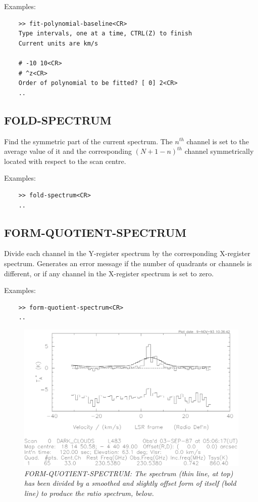 \documentclass[11pt,twoside]{report}
\begin{document}
Examples:
\begin{verbatim}
    >> fit-polynomial-baseline<CR>
    Type intervals, one at a time, CTRL(Z) to finish
    Current units are km/s  

    # -10 10<CR>
    # ^z<CR>
    Order of polynomial to be fitted? [ 0] 2<CR>
    ..
\end{verbatim}

\subsection{FOLD-SPECTRUM} 

Find the symmetric part of the current spectrum. The $n^{th}$ channel is set to 
the average value of it and the corresponding $(N+1-n)^{th}$ channel
symmetrically located with respect to the scan centre.

Examples:
\begin{verbatim}
    >> fold-spectrum<CR>
    ..
\end{verbatim}

\subsection{FORM-QUOTIENT-SPECTRUM} 

Divide each channel in the Y-register spectrum by the corresponding X-register
spectrum. Generates an error message if the number of quadrants or channels
is different, or if any channel in the X-register spectrum is set to zero.

Examples:
\begin{verbatim}
    >> form-quotient-spectrum<CR>
    ..
\end{verbatim}

\begin{figure}[htbp]
\begin{center}
\includegraphics[scale=0.65]{quotient.ps}
\protect\parbox{5.5in}
{\caption[QUOTIENT]
{\sl
FORM-QUOTIENT-SPECTRUM: The spectrum (thin line, at top) has been divided by
a smoothed and slightly offset form of itself (bold line) to produce the
ratio spectrum, below.
\label{QUOTIENT}
}
}
\end{center}
\end{figure}
\end{document}
